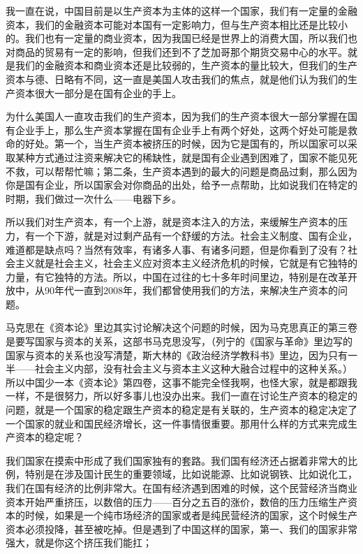 \documentclass[UTF8, 12pt, a4paper]{ctexrep}
\begin{document}
我一直在说，中国目前是以生产资本为主体的这样一个国家，我们有一定量的金融资本，我们的金融资本可能对本国有一定影响力，但与生产资本相比还是比较小的。我们也有一定量的商业资本，因为我国已经是世界上的消费大国，所以我们也对商品的贸易有一定的影响，但我们还到不了芝加哥那个期货交易中心的水平。就是我们的金融资本和商业资本还是比较弱的，生产资本的量比较大，但我们的生产资本与德、日略有不同，这一直是美国人攻击我们的焦点，就是他们认为我们的生产资本很大一部分是在国有企业的手上。

为什么美国人一直攻击我们的生产资本，因为我们的生产资本很大一部分掌握在国有企业手上，那么生产资本掌握在国有企业手上有两个好处，这两个好处可能是救命的好处。第一个，当生产资本被挤压的时候，因为它是国有的，所以国家可以采取某种方式通过注资来解决它的稀缺性，就是国有企业遇到困难了，国家不能见死不救，可以帮帮忙嘛；第二条，生产资本遇到的最大的问题是商品过剩，那么因为你是国有企业，所以国家会对你商品的出处，给予一点帮助，比如说我们在特定的时期，我们做过一次什么——电器下乡。

所以我们对生产资本，有一个上游，就是资本注入的方法，来缓解生产资本的压力，有一个下游，就是对过剩产品有一个舒缓的方法。社会主义制度、国有企业，难道都是缺点吗？当然有效率，有诸多人事、有诸多问题，但是你看到了没有？社会主义就是社会主义，社会主义应对资本主义经济危机的时候，它就是有它独特的力量，有它独特的方法。所以，中国在过往的七十多年时间里边，特别是在改革开放中，从90年代一直到2008年，我们都曾使用我们的方法，来解决生产资本的问题。

马克思在《资本论》里边其实讨论解决这个问题的时候，因为马克思真正的第三卷是要写国家与资本的关系，这部书马克思没写，（列宁的《国家与革命》里边写的国家与资本的关系也没写清楚，斯大林的《政治经济学教科书》里边，因为只有一半——社会主义内部，没有社会主义与资本主义这种大融合过程中的这种关系。）所以中国少一本《资本论》第四卷，这事不能完全怪我啊，也怪大家，就是都跟我一样，不是很努力，所以好多事儿也没办出来。我们一直在讨论生产资本的稳定的问题，就是一个国家的稳定跟生产资本的稳定是有关联的，生产资本的稳定决定了一个国家的就业和国民经济增长，这一件事情很重要。那用什么样的方式来完成生产资本的稳定呢？

我们国家在摸索中形成了我们国家独有的套路。我们国有经济还占据着非常大的比例，特别是在涉及国计民生的重要领域，比如说能源、比如说钢铁、比如说化工，我们在国有经济的比例非常大。在国有经济遇到困难的时候，这个民营经济当商业资本开始严重挤压，以数倍的压力——百分之五百的涨价，数倍的压力压缩生产资本的时候，如果是一个纯市场经济的国家或者是纯民营经济的国家，这个时候生产资本必须投降，甚至被吃掉。但是遇到了中国这样的国家，第一、我们的国家非常强大，就是你这个挤压我们能扛；
\end{document}
